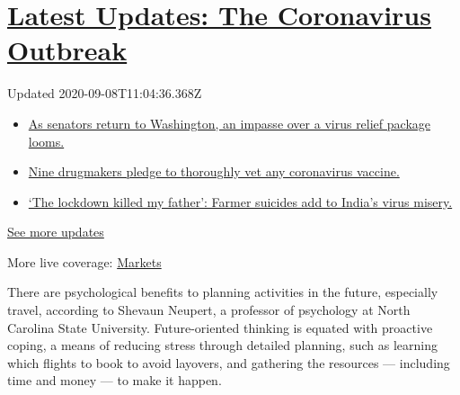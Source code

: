 \hypertarget{latest-updates-the-coronavirus-outbreak}{%
\section{\texorpdfstring{\href{https://www.nytimes3xbfgragh.onion/2020/09/08/world/covid-19-coronavirus.html?action=click\&pgtype=Article\&state=default\&region=MAIN_CONTENT_1\&context=storylines_live_updates}{Latest
Updates: The Coronavirus
Outbreak}}{Latest Updates: The Coronavirus Outbreak}}\label{latest-updates-the-coronavirus-outbreak}}

Updated 2020-09-08T11:04:36.368Z

\begin{itemize}
\tightlist
\item
  \href{https://www.nytimes3xbfgragh.onion/2020/09/08/world/covid-19-coronavirus.html?action=click\&pgtype=Article\&state=default\&region=MAIN_CONTENT_1\&context=storylines_live_updates\#link-4a77847f}{As
  senators return to Washington, an impasse over a virus relief package
  looms.}
\item
  \href{https://www.nytimes3xbfgragh.onion/2020/09/08/world/covid-19-coronavirus.html?action=click\&pgtype=Article\&state=default\&region=MAIN_CONTENT_1\&context=storylines_live_updates\#link-679303d7}{Nine
  drugmakers pledge to thoroughly vet any coronavirus vaccine.}
\item
  \href{https://www.nytimes3xbfgragh.onion/2020/09/08/world/covid-19-coronavirus.html?action=click\&pgtype=Article\&state=default\&region=MAIN_CONTENT_1\&context=storylines_live_updates\#link-1c973131}{`The
  lockdown killed my father': Farmer suicides add to India's virus
  misery.}
\end{itemize}

\href{https://www.nytimes3xbfgragh.onion/2020/09/08/world/covid-19-coronavirus.html?action=click\&pgtype=Article\&state=default\&region=MAIN_CONTENT_1\&context=storylines_live_updates}{See
more updates}

More live coverage:
\href{https://www.nytimes3xbfgragh.onion/live/2020/09/08/business/stock-market-today-coronavirus?action=click\&pgtype=Article\&state=default\&region=MAIN_CONTENT_1\&context=storylines_live_updates}{Markets}

There are psychological benefits to planning activities in the future,
especially travel, according to Shevaun Neupert, a professor of
psychology at North Carolina State University. Future-oriented thinking
is equated with proactive coping, a means of reducing stress through
detailed planning, such as learning which flights to book to avoid
layovers, and gathering the resources --- including time and money ---
to make it happen.

